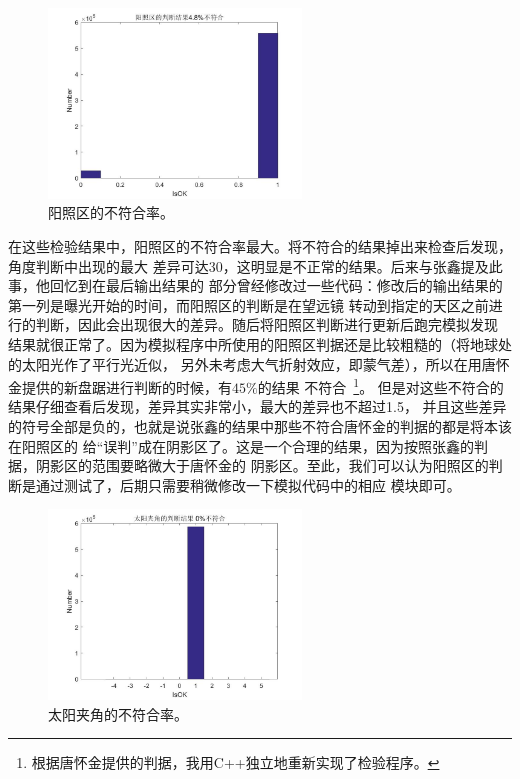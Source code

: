 \begin{figure}
\centering
\includegraphics[width=0.6\textwidth]{figs/check_results/sunside_disagreement.png}
\caption{阳照区的不符合率。}
\label{0411_check_results5}
\end{figure}
在这些检验结果中，阳照区的不符合率最大。将不符合的结果掉出来检查后发现，角度判断中出现的最大
差异可达30\textdegree，这明显是不正常的结果。后来与张鑫提及此事，他回忆到在最后输出结果的
部分曾经修改过一些代码：修改后的输出结果的第一列是曝光开始的时间，而阳照区的判断是在望远镜
转动到指定的天区之前进行的判断，因此会出现很大的差异。随后将阳照区判断进行更新后跑完模拟发现
结果就很正常了。因为模拟程序中所使用的阳照区判据还是比较粗糙的（将地球处的太阳光作了平行光近似，
另外未考虑大气折射效应，即蒙气差），所以在用唐怀金提供的新盘踞进行判断的时候，有$45\%$的结果
不符合~\footnote{根据唐怀金提供的判据，我用C++独立地重新实现了检验程序。}。
但是对这些不符合的结果仔细查看后发现，差异其实非常小，最大的差异也不超过1.5\textdegree，
并且这些差异的符号全部是负的，也就是说张鑫的结果中那些不符合唐怀金的判据的都是将本该在阳照区的
给“误判”成在阴影区了。这是一个合理的结果，因为按照张鑫的判据，阴影区的范围要略微大于唐怀金的
阴影区。至此，我们可以认为阳照区的判断是通过测试了，后期只需要稍微修改一下模拟代码中的相应
模块即可。

\begin{figure}
\centering
\includegraphics[width=0.6\textwidth]{figs/check_results/sun_angle_disagreement.png}
\caption{太阳夹角的不符合率。}
\label{0411_check_results6}
\end{figure}


